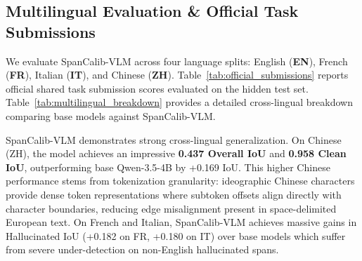 \documentclass[11pt]{article}
\begin{document}
\subsection{Multilingual Evaluation \& Official Task Submissions}

We evaluate SpanCalib-VLM across four language splits: English (\textbf{EN}), French (\textbf{FR}), Italian (\textbf{IT}), and Chinese (\textbf{ZH}). Table~\ref{tab:official_submissions} reports official shared task submission scores evaluated on the hidden test set. Table~\ref{tab:multilingual_breakdown} provides a detailed cross-lingual breakdown comparing base models against SpanCalib-VLM.

\begin{table}[t]
\centering
\caption{Official shared task test set results: SpanCalib-VLM (SIT) vs.\ the task-provided baseline across all languages.}
\label{tab:official_submissions}
\end{table}



SpanCalib-VLM demonstrates strong cross-lingual generalization. On Chinese (ZH), the model achieves an impressive \textbf{0.437 Overall IoU} and \textbf{0.958 Clean IoU}, outperforming base Qwen-3.5-4B by +0.169 IoU. This higher Chinese performance stems from tokenization granularity: ideographic Chinese characters provide dense token representations where subtoken offsets align directly with character boundaries, reducing edge misalignment present in space-delimited European text. On French and Italian, SpanCalib-VLM achieves massive gains in Hallucinated IoU (+0.182 on FR, +0.180 on IT) over base models which suffer from severe under-detection on non-English hallucinated spans.
\end{document}

